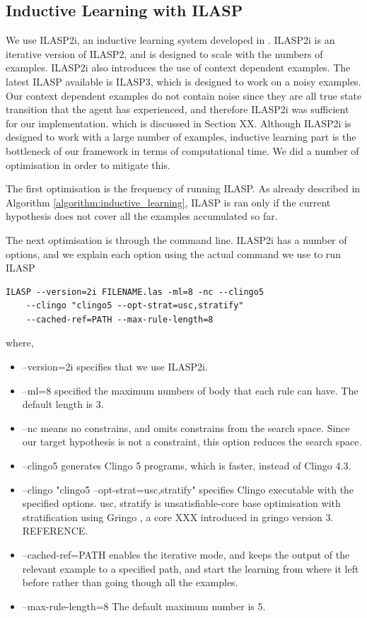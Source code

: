 \subsection{Inductive Learning with ILASP}
We use ILASP2i, an inductive learning system developed in \cite{Law2016b}.
ILASP2i is an iterative version of ILASP2, and is designed to scale with the numbers of examples. 
ILASP2i also introduces the use of context dependent examples.
The latest ILASP available is ILASP3, which is designed to work on a noisy examples. Our context dependent examples do not contain noise since they are all true state transition that the agent has experienced, and therefore ILASP2i was sufficient for our implementation.
which is discussed in Section XX. 
Although ILASP2i is designed to work with a large number of examples, inductive learning part is the bottleneck of our framework in terms of computational time. 
We did a number of optimisation in order to mitigate this. 

The first optimisation is the frequency of running ILASP. 
As already described in Algorithm \ref{algorithm:inductive_learning}, ILASP is ran only if the current hypothesis does not cover all the examples accumulated so far.

The next optimisation is through the command line. 
ILASP2i has a number of options, and we explain each option using the actual command we use to run ILASP

\begin{lstlisting}[]
    ILASP --version=2i FILENAME.las -ml=8 -nc --clingo5 
    --clingo "clingo5 --opt-strat=usc,stratify" 
    --cached-ref=PATH --max-rule-length=8
\end{lstlisting}

where,
\begin{itemize}
\item \textsf{--version=2i} specifies that we use ILASP2i.
\item \textsf{--ml=8} specified the maximum numbers of body that each rule can have. The default length is 3.
\item \textsf{--nc} means no constrains, and omits constrains from the search space. Since our target hypothesis is not a constraint, this option reduces the search space.
\item \textsf{--clingo5} generates Clingo 5 programs, which is faster, instead of Clingo 4.3.
\item \textsf{--clingo "clingo5 --opt-strat=usc,stratify"} specifies Clingo executable with the specified options. 
\textsf{usc, stratify} is unsatisfiable-core base optimisation with stratification using Gringo \cite{gringo}, a core XXX introduced in gringo version 3. REFERENCE.
\item \textsf{--cached-ref=PATH} enables the iterative mode, and keeps the output of the relevant example to a specified path, and start the learning from where it left before rather than going though all the examples.
\item \textsf{--max-rule-length=8} The default maximum number is 5.
\end{itemize}

